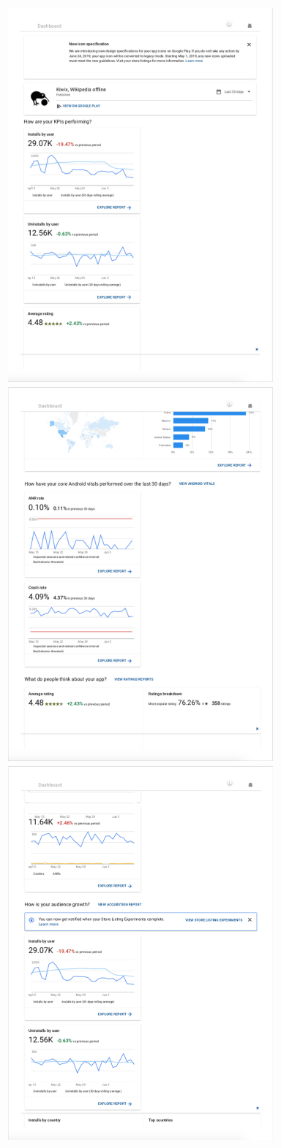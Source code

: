 \begin{figure}
    \centering
    \includegraphics[width=7cm]{images/google-play-console/Dashboard - Kiwix-Google-Play-Console-(2019-Jun-14)-p1.png}
    \includegraphics[width=7cm]{images/google-play-console/Dashboard - Kiwix-Google-Play-Console-(2019-Jun-14)-p3.png}
    \newline
    \includegraphics[width=7cm]{images/google-play-console/Dashboard - Kiwix-Google-Play-Console-(2019-Jun-14)-p2.png}

\end{figure}
